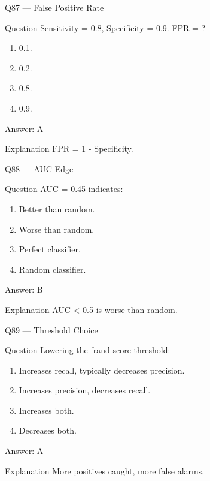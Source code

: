 \documentclass[aspectratio=169,8pt]{beamer}
\begin{document}
	\begin{frame}{Q87 --- False Positive Rate}
		\begin{block}{Question}
			Sensitivity = 0.8, Specificity = 0.9. FPR = ?
		\end{block}
		\begin{enumerate}
			\item 0.1.
			\item 0.2.
			\item 0.8.
			\item 0.9.
		\end{enumerate}
		\begin{exampleblock}{Answer: A}\end{exampleblock}
		\begin{block}{Explanation}
			FPR = 1 - Specificity.
		\end{block}
	\end{frame}
	
	\begin{frame}{Q88 --- AUC Edge}
		\begin{block}{Question}
			AUC = 0.45 indicates:
		\end{block}
		\begin{enumerate}
			\item Better than random.
			\item Worse than random.
			\item Perfect classifier.
			\item Random classifier.
		\end{enumerate}
		\begin{exampleblock}{Answer: B}\end{exampleblock}
		\begin{block}{Explanation}
			AUC < 0.5 is worse than random.
		\end{block}
	\end{frame}
	
	\begin{frame}{Q89 --- Threshold Choice}
		\begin{block}{Question}
			Lowering the fraud-score threshold:
		\end{block}
		\begin{enumerate}
			\item Increases recall, typically decreases precision.
			\item Increases precision, decreases recall.
			\item Increases both.
			\item Decreases both.
		\end{enumerate}
		\begin{exampleblock}{Answer: A}\end{exampleblock}
		\begin{block}{Explanation}
			More positives caught, more false alarms.
		\end{block}
	\end{frame}
	
\end{document}

